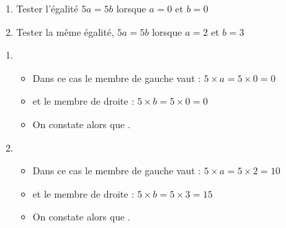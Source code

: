 \begin{exemple*1}
    \begin{enumerate}
    \item Tester l'égalité $5a=5b$ lorsque $a=0$ et $b=0$
    \item Tester la même égalité, $5a=5b$ lorsque $a=2$ et $b=3$
    \end{enumerate}
\correction
    \begin{enumerate}
        \item 
        \begin{itemize}
            \item Dans ce cas le membre de gauche vaut : $5\times a=5\times 0=0$
            \item  et le membre de droite : $5\times b=5\times 0=0$
            \item On constate alors que .
        \end{itemize}
        \item 
        \begin{itemize}
            \item Dans ce cas le membre de gauche vaut : $5\times a=5\times 2=10$
            \item et le membre de droite : $5\times b=5\times3=15$
            \item On constate alors que .
        \end{itemize}
    \end{enumerate}
    \vspace*{-7mm}
\end{exemple*1}